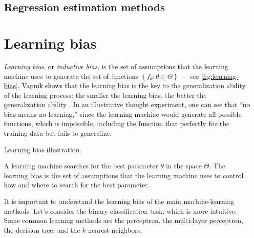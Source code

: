 \subsection{Regression estimation methods}

\newpage
\section{Learning bias}

\emph{Learning bias}, or \emph{inductive bias}, is the set of assumptions that the
learning machine uses to generate the set of functions $\left\{ f_\theta : \theta \in
\Theta \right\}$ --- see \cref{fig:learning-bias}.  Vapnik shows that the learning bias is the key to the generalization
ability of the learning process: the smaller the learning bias, the better the
generalization ability \parencite{Vapnik1999b}.  In an illustrative thought experiment,
one can see that ``no bias means no learning,'' since the learning machine would generate
all possible functions, which is impossible, including the function that perfectly fits
the training data but fails to generalize.

\begin{figurebox}[label=fig:learning-bias]{Learning bias illustration.}
  \centering
  \tcblower
  A learning machine searches for the best parameter $\theta$ in the space $\Theta$.
  The learning bias is the set of assumptions that the learning machine uses to control
  how and where to search for the best parameter.
\end{figurebox}

It is important to understand the learning bias of the main machine-learning methods.  Let's
consider the binary classification task, which is more intuitive.  Some common learning
methods are the perceptron, the multi-layer perceptron, the decision tree, and the
$k$-nearest neighbors.

